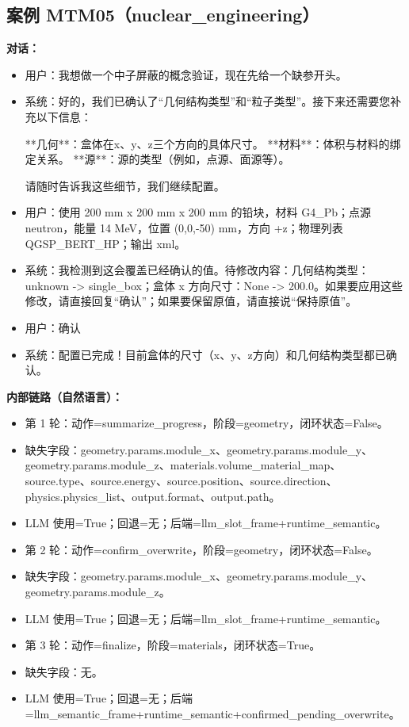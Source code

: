 \documentclass[11pt]{ctexart}
\begin{document}
\subsection{案例 MTM05（nuclear\_engineering）}
\textbf{对话：}
\begin{itemize}
\item 用户：我想做一个中子屏蔽的概念验证，现在先给一个缺参开头。
\item 系统：好的，我们已确认了“几何结构类型”和“粒子类型”。接下来还需要您补充以下信息：

**几何**：盒体在x、y、z三个方向的具体尺寸。
**材料**：体积与材料的绑定关系。
**源**：源的类型（例如，点源、面源等）。

请随时告诉我这些细节，我们继续配置。
\item 用户：使用 200 mm x 200 mm x 200 mm 的铅块，材料 G4\_Pb；点源 neutron，能量 14 MeV，位置 (0,0,-50) mm，方向 +z；物理列表 QGSP\_BERT\_HP；输出 xml。
\item 系统：我检测到这会覆盖已经确认的值。待修改内容：几何结构类型：unknown -> single\_box；盒体 x 方向尺寸：None -> 200.0。如果要应用这些修改，请直接回复“确认”；如果要保留原值，请直接说“保持原值”。
\item 用户：确认
\item 系统：配置已完成！目前盒体的尺寸（x、y、z方向）和几何结构类型都已确认。
\end{itemize}
\textbf{内部链路（自然语言）：}
\begin{itemize}
\item 第 1 轮：动作=summarize\_progress，阶段=geometry，闭环状态=False。
\item 缺失字段：geometry.params.module\_x、geometry.params.module\_y、geometry.params.module\_z、materials.volume\_material\_map、source.type、source.energy、source.position、source.direction、physics.physics\_list、output.format、output.path。
\item LLM 使用=True；回退=无；后端=llm\_slot\_frame+runtime\_semantic。
\item 第 2 轮：动作=confirm\_overwrite，阶段=geometry，闭环状态=False。
\item 缺失字段：geometry.params.module\_x、geometry.params.module\_y、geometry.params.module\_z。
\item LLM 使用=True；回退=无；后端=llm\_slot\_frame+runtime\_semantic。
\item 第 3 轮：动作=finalize，阶段=materials，闭环状态=True。
\item 缺失字段：无。
\item LLM 使用=True；回退=无；后端=llm\_semantic\_frame+runtime\_semantic+confirmed\_pending\_overwrite。
\end{itemize}
\end{document}
